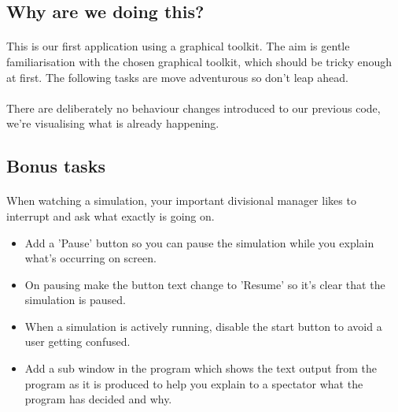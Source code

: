 \documentclass[11pt]{book}
\begin{document}
\subsection{Why are we doing this?}

\paragraph{} This is our first application using a graphical toolkit. The aim is gentle familiarisation with the chosen graphical toolkit, which should be tricky enough at first. The following tasks are move adventurous so don't leap ahead.

\paragraph{} There are deliberately no behaviour changes introduced to our previous code, we're visualising what is already happening.

\subsection{Bonus tasks}

\paragraph{} When watching a simulation, your important divisional manager likes to interrupt and ask what exactly is going on.

\begin{itemize}
\item Add a 'Pause' button so you can pause the simulation while you explain what's occurring on screen.
\item On pausing make the button text change to 'Resume' so it's clear that the simulation is paused.
\item When a simulation is actively running, disable the start button to avoid a user getting confused.
\item Add a sub window in the program which shows the text output from the program as it is produced to help you explain to a spectator what the program has decided and why.
\end{itemize}

\clearpage
\end{document}
